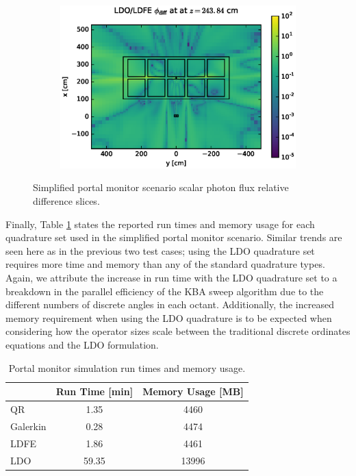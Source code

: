 \documentclass{article} %
\begin{document}
\begin{figure}[!htb]
\ContinuedFloat
\begin{subfigure}{\textwidth}
\centering
\includegraphics[max height=0.445\textheight]
{portal-flux-diff-ldfe.eps}
\end{subfigure}
\caption{Simplified portal monitor scenario scalar photon flux relative
         difference slices.}
\label{cargo-fwd-diff-rel}
\end{figure}

Finally, Table \ref{cargo-stats} states the reported run times and memory
usage for each quadrature set used in the simplified portal monitor scenario.
Similar trends are seen here as in the previous two test cases; using the LDO
quadrature set requires more time and memory than any of the standard
quadrature types. Again, we attribute the increase in run time with the LDO
quadrature set to a breakdown in the parallel efficiency of the KBA sweep
algorithm due to the different numbers of discrete angles in each octant.
Additionally, the increased memory requirement when using the LDO quadrature
is to be expected when considering how the operator sizes scale between the
traditional discrete ordinates equations and the LDO formulation.

\begin{table}[!htb]
\centering
\caption{Portal monitor simulation run times and memory usage.}
\label{cargo-stats}
\begin{tabular}{l|cc}
              & Run Time [min]      & Memory Usage [MB]      \\ \hline
QR            & 1.35 & 4460         \\
Galerkin      & 0.28 & 4474         \\
LDFE          & 1.86 & 4461         \\
LDO           & 59.35 & 13996
\end{tabular}
\end{table}
\end{document}
